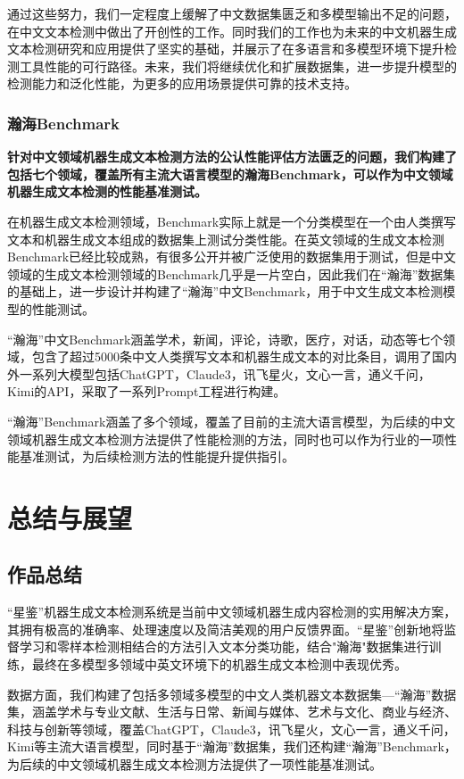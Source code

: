 \documentclass[a4paper]{report}
\begin{document}
通过这些努力，我们一定程度上缓解了中文数据集匮乏和多模型输出不足的问题，在中文文本检测中做出了开创性的工作。同时我们的工作也为未来的中文机器生成文本检测研究和应用提供了坚实的基础，并展示了在多语言和多模型环境下提升检测工具性能的可行路径。未来，我们将继续优化和扩展数据集，进一步提升模型的检测能力和泛化性能，为更多的应用场景提供可靠的技术支持。

\subsection{瀚海Benchmark}
\textbf{针对中文领域机器生成文本检测方法的公认性能评估方法匮乏的问题，我们构建了包括七个领域，覆盖所有主流大语言模型的瀚海Benchmark，可以作为中文领域机器生成文本检测的性能基准测试。}

在机器生成文本检测领域，Benchmark实际上就是一个分类模型在一个由人类撰写文本和机器生成文本组成的数据集上测试分类性能。在英文领域的生成文本检测Benchmark已经比较成熟，有很多公开并被广泛使用的数据集用于测试，但是中文领域的生成文本检测领域的Benchmark几乎是一片空白，因此我们在“瀚海”数据集的基础上，进一步设计并构建了“瀚海”中文Benchmark，用于中文生成文本检测模型的性能测试。

“瀚海”中文Benchmark涵盖学术，新闻，评论，诗歌，医疗，对话，动态等七个领域，包含了超过5000条中文人类撰写文本和机器生成文本的对比条目，调用了国内外一系列大模型包括ChatGPT，Claude3，讯飞星火，文心一言，通义千问，Kimi的API，采取了一系列Prompt工程进行构建。

“瀚海”Benchmark涵盖了多个领域，覆盖了目前的主流大语言模型，为后续的中文领域机器生成文本检测方法提供了性能检测的方法，同时也可以作为行业的一项性能基准测试，为后续检测方法的性能提升提供指引。


\chapter{总结与展望}
\section{作品总结}
“星鉴”机器生成文本检测系统是当前中文领域机器生成内容检测的实用解决方案，其拥有极高的准确率、处理速度以及简洁美观的用户反馈界面。“星鉴”创新地将监督学习和零样本检测相结合的方法引入文本分类功能，结合"瀚海"数据集进行训练，最终在多模型多领域中英文环境下的机器生成文本检测中表现优秀。

数据方面，我们构建了包括多领域多模型的中文人类机器文本数据集---“瀚海”数据集，涵盖学术与专业文献、生活与日常、新闻与媒体、艺术与文化、商业与经济、科技与创新等领域，覆盖ChatGPT，Claude3，讯飞星火，文心一言，通义千问，Kimi等主流大语言模型，同时基于“瀚海”数据集，我们还构建“瀚海”Benchmark，为后续的中文领域机器生成文本检测方法提供了一项性能基准测试。
\end{document}
